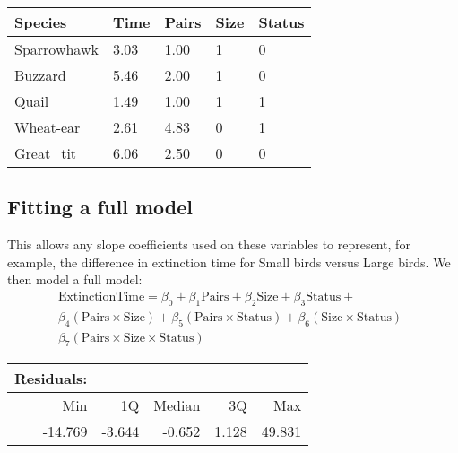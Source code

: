 \documentclass[a4paper, 12pt]{article}
\begin{document}
\begin{spacing}{1.5}
\begin{table}[h]
\centering
\begin{tabular}{lllll}
\hline
\textbf{Species} & \textbf{Time} & \textbf{Pairs} & \textbf{Size} & \textbf{Status} \\ \hline
Sparrowhawk      & 3.03          & 1.00           & 1             & 0               \\
Buzzard          & 5.46          & 2.00           & 1             & 0               \\
Quail            & 1.49          & 1.00           & 1             & 1               \\
Wheat-ear        & 2.61          & 4.83           & 0             & 1               \\
Great\_tit       & 6.06          & 2.50           & 0             & 0               \\ \hline
\end{tabular}
\end{table}  
 
 \subsection{Fitting a full model}
This allows any slope coefficients used on these variables to represent, for example, the difference in extinction time for Small birds versus Large birds. We then model a full model:
\begin{equation}
\begin{split}
&\text{ExtinctionTime} = 
    \beta_0 + 
    \beta_1\text{Pairs} + 
    \beta_2\text{Size} + 
    \beta_3\text{Status} + \\
    &\beta_4(\text{Pairs}\times\text{Size}) +
    \beta_5(\text{Pairs}\times\text{Status}) +
    \beta_6(\text{Size}\times\text{Status}) + \\
    &\beta_7(\text{Pairs}\times\text{Size}\times\text{Status})
\end{split}
\end{equation}

\begin{table}[h]
\begin{tabular}{rrrrr}
\hline
\textbf{Residuals:} & & & & \\
\hline
Min     & 1Q     & Median & 3Q    & Max \\
-14.769 & -3.644 & -0.652 & 1.128 & 49.831 \\
\hline
\end{tabular}
\end{table}


\end{spacing}
\end{document}
